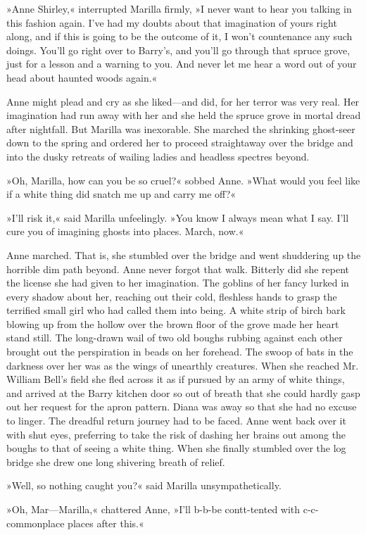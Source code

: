 »Anne Shirley,« interrupted Marilla firmly, »I never want to hear you talking in this fashion again. I’ve had my doubts about that imagination of yours right along, and if this is going to be the outcome of it, I won’t countenance any such doings. You’ll go right over to Barry’s, and you’ll go through that spruce grove, just for a lesson and a warning to you. And never let me hear a word out of your head about haunted woods again.«

Anne might plead and cry as she liked—and did, for her terror was very real. Her imagination had run away with her and she held the spruce grove in mortal dread after nightfall. But Marilla was inexorable. She marched the shrinking ghost-seer down to the spring and ordered her to proceed straightaway over the bridge and into the dusky retreats of wailing ladies and headless spectres beyond.

»Oh, Marilla, how can you be so cruel?« sobbed Anne. »What would you feel like if a white thing did snatch me up and carry me off?«

»I’ll risk it,« said Marilla unfeelingly. »You know I always mean what I say. I’ll cure you of imagining ghosts into places. March, now.«

Anne marched. That is, she stumbled over the bridge and went shuddering up the horrible dim path beyond. Anne never forgot that walk. Bitterly did she repent the license she had given to her imagination. The goblins of her fancy lurked in every shadow about her, reaching out their cold, fleshless hands to grasp the terrified small girl who had called them into being. A white strip of birch bark blowing up from the hollow over the brown floor of the grove made her heart stand still. The long-drawn wail of two old boughs rubbing against each other brought out the perspiration in beads on her forehead. The swoop of bats in the darkness over her was as the wings of unearthly creatures. When she reached Mr. William Bell’s field she fled across it as if pursued by an army of white things, and arrived at the Barry kitchen door so out of breath that she could hardly gasp out her request for the apron pattern. Diana was away so that she had no excuse to linger. The dreadful return journey had to be faced. Anne went back over it with shut eyes, preferring to take the risk of dashing her brains out among the boughs to that of seeing a white thing. When she finally stumbled over the log bridge she drew one long shivering breath of relief.

»Well, so nothing caught you?« said Marilla unsympathetically.

»Oh, Mar—Marilla,« chattered Anne, »I’ll b-b-be contt-tented with c-c-commonplace places after this.«